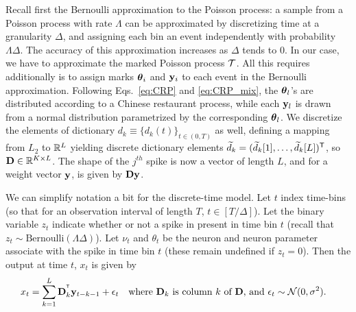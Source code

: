 Recall first the Bernoulli approximation to the Poisson process: a sample from a Poisson process with rate $\Lambda$ can be approximated by discretizing
time at a granularity $\Delta$, and assigning each bin an event independently with probability $\Lambda\Delta$. The accuracy of this approximation increases 
as $\Delta$ tends to $0$.
%
In our case, we have to approximate the marked Poisson process $\mathcal{T}$. All this requires additionally is to assign marks $\boldsymbol{\theta}_i$ and $\mathbf{y}_i$ to each event 
in the Bernoulli approximation. Following Eqs.~\eqref{eq:CRP} and \eqref{eq:CRP_mix}, the $\boldsymbol{\theta}_l$'s are distributed according
to a Chinese restaurant process, while each $\mathbf{y}_l$ is drawn from a normal distribution parametrized by the corresponding $\boldsymbol{\theta}_l$. We discretize the 
elements of dictionary $d_k \equiv \{d_k(t)\}_{t \in (0,T)}$ as well, defining a mapping from $L_2$ to $\mathbb{R}^L$ yielding discrete dictionary elements $\widetilde{d}_k=(\widetilde{d}_k[1], \ldots, \widetilde{d}_k[L])^{\mathsf{T}}$,  so  $\mathbf{D} \in \mathbb{R}^{K \times L}$. The shape of the $j^{th}$ spike is now a vector of length $L$, and for a weight vector
$\mathbf{y}$, is given by $\mathbf{D} \mathbf{y}$.

We can simplify notation a bit for the discrete-time model. Let $t$ index time-bins (so that for an observation interval of length $T$, $t \in [T/\Delta]$).
Let the binary variable $z_t$ indicate whether or not a spike in present in time bin $t$ (recall that $z_t \sim \text{Bernoulli}(\Lambda \Delta)$). Let
$\nu_t$ and $\theta_t$ be the neuron and neuron parameter associate with the spike in time bin $t$ (these remain undefined if $z_t = 0$).
Then the output at time $t$, $x_t$ is given by
\begin{align}
  x_t = \sum_{k = 1}^L \mathbf{D}_{k}^{^{\mathsf{T}}} \mathbf{y}_{t-k-1} + \epsilon_t &\text{\quad where $\mathbf{D}_{k}$ is column $k$ of $\mathbf{D}$, 
  and $\epsilon_t \sim \mathcal{N}(0,\sigma^2)$.} 
\end{align}
